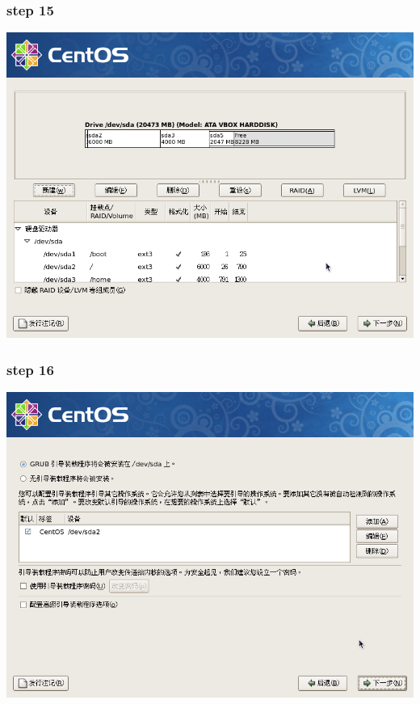 \documentclass[xcolor=svgnames,presentation]{beamer}
\begin{document}
\begin{frame}
\frametitle{step 15}
\label{sec-2-15}

\begin{center}
\includegraphics[width=.9\linewidth]{img/img23.png}
\end{center}
\end{frame}
\begin{frame}
\frametitle{step 16}
\label{sec-2-16}

\begin{center}
\includegraphics[width=.9\linewidth]{img/img24.png}
\end{center}
\end{frame}
\end{document}
